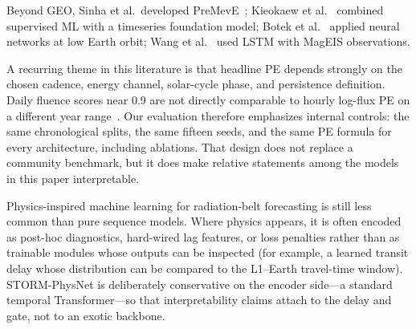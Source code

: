 ﻿\documentclass{ieeeaccess}
\begin{document}
Beyond GEO, Sinha et al.\ developed PreMevE~\cite{b25}; Kieokaew et
al.~\cite{b26} combined supervised ML with a timeseries foundation model; Botek
et al.~\cite{b27} applied neural networks at low Earth orbit; Wang et
al.~\cite{b12} used LSTM with MagEIS observations.

A recurring theme in this literature is that headline PE depends strongly on the
chosen cadence, energy channel, solar-cycle phase, and persistence definition.
Daily fluence scores near 0.9 are not directly comparable to hourly log-flux PE
on a different year range~\cite{b21,b22}. Our evaluation therefore emphasizes
internal controls: the same chronological splits, the same fifteen seeds, and the
same PE formula for every architecture, including ablations. That design does not
replace a community benchmark, but it does make relative statements among the
models in this paper interpretable.

Physics-inspired machine learning for radiation-belt forecasting is still less
common than pure sequence models. Where physics appears, it is often encoded as
post-hoc diagnostics, hard-wired lag features, or loss penalties rather than as
trainable modules whose outputs can be inspected (for example, a learned transit
delay whose distribution can be compared to the L1--Earth travel-time window).
STORM-PhysNet is deliberately conservative on the encoder side---a standard
temporal Transformer---so that interpretability claims attach to the delay and
gate, not to an exotic backbone.
\end{document}
